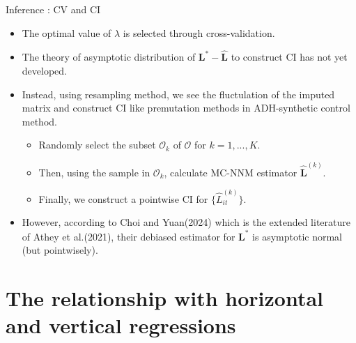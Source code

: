 \documentclass[xcolor=svgnames,aspectratio=169]{beamer}
\begin{document}
\begin{frame}{Inference : CV and CI}
    \begin{itemize}
        \item The optimal value of $\lambda$ is selected through \alert{cross-validation}.
        \item The theory of asymptotic distribution of $\mathbf{L^*}-\mathbf{\hat{L}}$ to construct CI has not yet developed.
        \item Instead, using resampling method, we see the fluctulation of the imputed matrix and construct CI like premutation methods in ADH-synthetic control method.
        \begin{itemize}
            \item Randomly select the subset $\mathcal{O}_k$ of $\mathcal{O} $ for $k=1,...,K$.
            \item Then, using the sample in $ \mathcal{O}_k$, calculate MC-NNM estimator $\hat{\mathbf{L}}^{(k)}$.
            \item Finally, we construct a pointwise CI for $\{\hat{L}_{it}^{(k)}\}$.
        \end{itemize}
        \item However, according to Choi and Yuan(2024) which is the extended literature of Athey et al.(2021), their \alert{debiased} estimator for $\mathbf{L}^*$ is \alert{asymptotic normal} (but pointwisely).
    \end{itemize}
\end{frame}

\section{The relationship with horizontal and vertical regressions}
\end{document}
